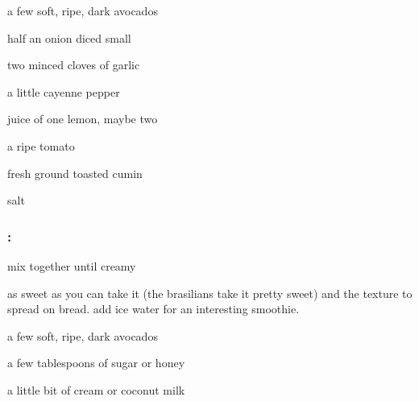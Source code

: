 \begin{ingredients}
  \item a few soft, ripe, dark avocados
  \item half an onion diced small
  \item two minced cloves of garlic
  \item a little cayenne pepper
  \item juice of one lemon, maybe two
  \item a ripe tomato
  \item fresh ground toasted cumin
  \item salt
\end{ingredients}

\subsubsection{:}

\begin{ingredients}
  \item mix together until creamy
  \item as sweet as you can take it (the brasilians take it pretty sweet) and 
  the texture to spread on bread. add ice water for an interesting smoothie.
\end{ingredients}

\begin{ingredients}
  \item a few soft, ripe, dark avocados
  \item a few tablespoons of sugar or honey
  \item a little bit of cream or coconut milk
\end{ingredients}
